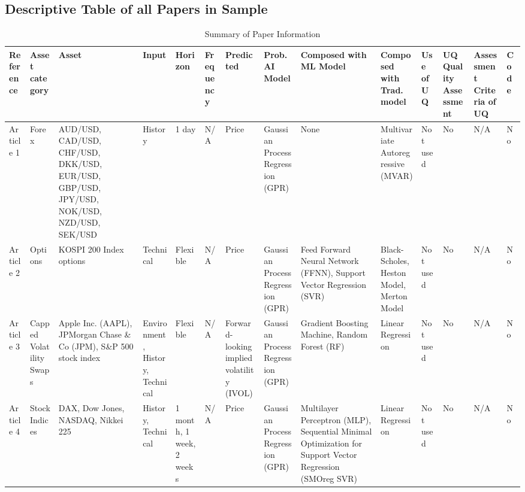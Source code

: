 \subsection{Descriptive Table of all Papers in Sample}
\label{appendix:descriptive_table_of_all_articles}

\begin{sidewaystable} %
    \centering
    \caption[Descriptive table of all papers in sample]{Summary of Paper Information}
    \label{table:paper_info_summary}
    \scriptsize %
    \begin{adjustbox}{width=1\textheight, center} %
    \begin{tabular}{p{} p{} p{} p{} p{} p{} p{} p{} p{} p{} p{} p{} p{} p{}}
        \toprule
        \textbf{Reference} & \textbf{Asset category} & \textbf{Asset} & \textbf{Input} & \textbf{Horizon} & \textbf{Frequency} & \textbf{Predicted} & \textbf{Prob. AI Model} & \textbf{Composed with ML Model} & \textbf{Composed with Trad. model} & \textbf{Use of UQ} & \textbf{UQ Quality Assessment} & \textbf{Assessment Criteria of UQ} & \textbf{Code} \\
        \midrule
        Article 1 & Forex & AUD/USD, CAD/USD, CHF/USD, DKK/USD, EUR/USD, GBP/USD, JPY/USD, NOK/USD, NZD/USD, SEK/USD & History & 1 day & N/A & Price & Gaussian Process Regression (GPR) & None & Multivariate Autoregressive (MVAR) & Not used & No & N/A & No \\

        Article 2 & Options & KOSPI 200 Index options & Technical & Flexible & N/A & Price & Gaussian Process Regression (GPR) & Feed Forward Neural Network (FFNN), Support Vector Regression (SVR) & Black-Scholes, Heston Model, Merton Model & Not used & No & N/A & No \\

        Article 3 & Capped Volatility Swaps & Apple Inc. (AAPL), JPMorgan Chase \& Co (JPM), S\&P 500 stock index & Environment, History, Technical & Flexible & N/A & Forward-looking implied volatility (IVOL) & Gaussian Process Regression (GPR) & Gradient Boosting Machine, Random Forest (RF) & Linear Regression & Not used & No & N/A & No \\
        
        Article 4 & Stock Indices & DAX, Dow Jones, NASDAQ, Nikkei 225 & History, Technical & 1 month, 1 week, 2 weeks & N/A & Price & Gaussian Process Regression (GPR) & Multilayer Perceptron (MLP), Sequential Minimal Optimization for Support Vector Regression (SMOreg SVR) & Linear Regression & Not used & No & N/A & No \\
        

\end{tabular}
\end{adjustbox}
\end{sidewaystable}
